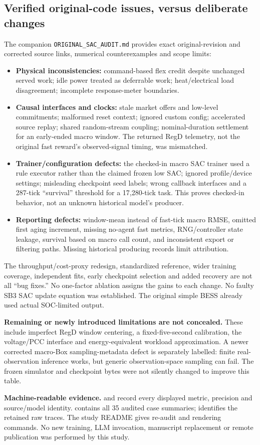 \documentclass[10pt]{article}
\begin{document}
\subsection*{Verified original-code issues, versus deliberate changes}
The companion \texttt{ORIGINAL\_SAC\_AUDIT.md} provides exact original-revision
and corrected source links, numerical counterexamples and scope limits:
\begin{itemize}
\setlength{\itemsep}{3pt}
\item \textbf{Physical inconsistencies:} command-based flex credit despite
unchanged served work; idle power treated as deferrable work; heat/electrical
load disagreement; incomplete response-meter boundaries.
\item \textbf{Causal interfaces and clocks:} stale market offers and low-level
commitments; malformed reset context; ignored custom config; accelerated
source replay; shared random-stream coupling; nominal-duration settlement
for an early-ended macro window. The returned RegD telemetry, not the
original fast reward's observed-signal timing, was mismatched.
\item \textbf{Trainer/configuration defects:} the checked-in macro SAC trainer
used a rule executor rather than the claimed frozen low SAC; ignored
profile/device settings; misleading checkpoint seed labels; wrong callback
interfaces and a 287-tick ``survival'' threshold for a 17,280-tick task.
This proves checked-in behavior, not an unknown historical model's producer.
\item \textbf{Reporting defects:} window-mean instead of fast-tick macro RMSE,
omitted first aging increment, missing no-agent fast metrics, RNG/controller
state leakage, survival based on macro call count, and inconsistent export
or filtering paths. Missing historical producing records limit attribution.
\end{itemize}

The throughput/cost-proxy redesign, standardized reference, wider training
coverage, independent fits, early checkpoint selection and added recovery are
not all ``bug fixes.'' No one-factor ablation assigns the gains to each change.
No faulty SB3 SAC update equation was established.
The original simple BESS already used actual SOC-limited output.

\textbf{Remaining or newly introduced limitations are not concealed.}
These include imperfect RegD window centering, a fixed-five-second calibration,
the voltage/PCC interface and energy-equivalent workload approximation.
A newer corrected macro-Box sampling-metadata defect is separately labelled:
finite real-observation inference works, but generic observation-space
sampling can fail. The frozen simulator and checkpoint bytes were not
silently changed to improve this table.

\textbf{Machine-readable evidence.}
 and  record every
displayed metric, precision and source/model identity.
 contains all 35 audited case summaries;
 identifies the retained raw traces.
The study README gives re-audit and rendering commands.
No new training, LLM invocation, manuscript replacement or remote publication
was performed by this study.
\end{document}
